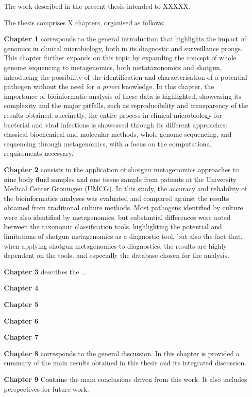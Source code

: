The work described in the present thesis intended to XXXXX.

The thesis comprises X chapters, organised as follows:

\textbf{Chapter 1} corresponds to the general introduction that highlights the impact of genomics in clinical microbiology, both in its diagnostic and surveillance prongs. This chapter further expands on this topic by expanding the concept of whole genome sequencing to metagenomics, both metataxonomics and shotgun, introducing the possibility of the identification and characterisation of a potential pathogen without the need for \textit{a priori} knowledge. In this chapter, the importance of bioinformatic analysis of these data is highlighted, showcasing its complexity and the major pitfalls, such as reproducibility and transparency of the results obtained. succinctly, the entire process in clinical microbiology for bacterial and viral infections is showcased through its different approaches: classical biochemical and molecular methods, whole genome sequencing, and sequencing through metagenomics, with a focus on the computational requirements necessary. 

\textbf{Chapter 2} consists in the application of shotgun metagenomics approaches to  nine body fluid samples and one tissue sample from patients at the University Medical Center Groningen (UMCG). In this study, the accuracy and reliability of the bioinformatics analyses was evaluated and compared against the results obtained from traditional culture methods. Most pathogens identified by culture were also identified by metagenomics, but substantial differences were noted between the taxonomic classification tools, highlighting the potential and limitations of shotgun metagenomics as a diagnostic tool, but also the fact that, when applying shotgun metagenomics to diagnostics, the results are highly dependent on the tools, and especially the database chosen for the analysis.

\textbf{Chapter 3} describes the ...

\textbf{Chapter 4}

\textbf{Chapter 5}

\textbf{Chapter 6}

\textbf{Chapter 7}

\textbf{Chapter 8} corresponds to the general discussion. In this chapter is provided a
summary of the main results obtained in this thesis and its integrated discussion. 

\textbf{Chapter 9} Contains the main conclusions driven from this work. It also includes perspectives for future work. 